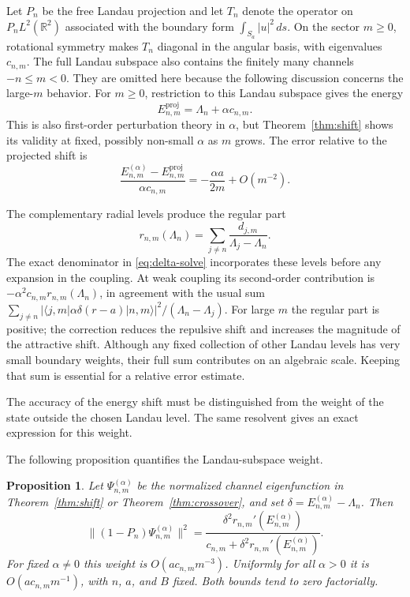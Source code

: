 \documentclass[12pt,a4paper]{article}
\numberwithin{equation}{section}
\newtheorem{prop}[thm]{Proposition}
\theoremstyle{remark}
\theoremstyle{definition}
\newcommand{\R}{\mathbb R}
\begin{document}
Let $P_n$ be the free Landau projection and let $T_n$ denote the operator
on $P_nL^2(\R^2)$ associated with the boundary form
$\int_{S_a}|u|^2\,ds$. On the sector $m\ge0$, rotational symmetry makes
$T_n$ diagonal in the angular basis, with eigenvalues $c_{n,m}$. The full
Landau subspace also contains the finitely many channels $-n\le m<0$.
They are omitted here because the following discussion concerns the
large-$m$ behavior. For $m\ge0$, restriction to this Landau subspace gives
the energy
\begin{equation}\label{eq:projected-energy}
E_{n,m}^{\mathrm{proj}}=\Lambda_n+\alpha c_{n,m}.
\end{equation}
This is also first-order perturbation theory in $\alpha$, but
Theorem~\ref{thm:shift} shows its validity at fixed, possibly non-small
$\alpha$ as $m$ grows. The error relative to the projected shift is
\begin{equation}\label{eq:projection-error}
\frac{E_{n,m}^{(\alpha)}-E_{n,m}^{\mathrm{proj}}}
{\alpha c_{n,m}}
=-\frac{\alpha a}{2m}+O(m^{-2}).
\end{equation}

The complementary radial levels produce the regular part
$$
r_{n,m}(\Lambda_n)=\sum_{j\ne n}\frac{d_{j,m}}{\Lambda_j-\Lambda_n}.
$$
The exact denominator in \eqref{eq:delta-solve} incorporates these levels
before any expansion in the coupling. At weak coupling its second-order
contribution is
$-\alpha^2c_{n,m}r_{n,m}(\Lambda_n)$, in agreement with the usual sum
$\sum_{j\ne n}|\langle j,m|\alpha\delta(r-a)|n,m\rangle|^2/
(\Lambda_n-\Lambda_j)$. For large $m$ the regular part is positive;
the correction reduces the repulsive shift and increases the magnitude
of the attractive shift. Although any fixed collection of other Landau
levels has very small boundary weights, their full sum contributes on an
algebraic scale. Keeping that sum is essential for a relative error estimate.

The accuracy of the energy shift must be distinguished from the weight of
the state outside the chosen Landau level. The same resolvent gives an
exact expression for this weight.

The following proposition quantifies the Landau-subspace weight.

\begin{prop}\label{prop:landau-weight}
Let $\Psi_{n,m}^{(\alpha)}$ be the normalized channel eigenfunction
in Theorem~\ref{thm:shift} or Theorem~\ref{thm:crossover}, and set
$\delta=E_{n,m}^{(\alpha)}-\Lambda_n$. Then
\begin{equation}\label{eq:landau-weight}
\|(1-P_n)\Psi_{n,m}^{(\alpha)}\|^2
=\frac{\delta^2 r_{n,m}'(E_{n,m}^{(\alpha)})}
{c_{n,m}+\delta^2 r_{n,m}'(E_{n,m}^{(\alpha)})}.
\end{equation}
For fixed $\alpha\ne0$ this weight is $O(a c_{n,m}m^{-3})$.
Uniformly for all $\alpha>0$ it is $O(a c_{n,m}m^{-1})$, with
$n$, $a$, and $B$ fixed. Both bounds tend to zero factorially.
\end{prop}
\end{document}
